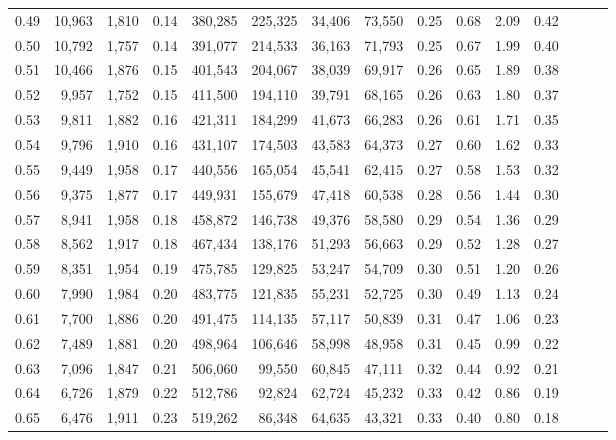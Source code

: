\begin{tabular}{rrrrrrrrrrrrrrr}
0.49 &  10,963 &  1,810 &  0.14 &  380,285 &  225,325 &   34,406 &   73,550 &  0.25 &  0.68 &  2.09 &      0.42 \\
0.50 &  10,792 &  1,757 &  0.14 &  391,077 &  214,533 &   36,163 &   71,793 &  0.25 &  0.67 &  1.99 &      0.40 \\
0.51 &  10,466 &  1,876 &  0.15 &  401,543 &  204,067 &   38,039 &   69,917 &  0.26 &  0.65 &  1.89 &      0.38 \\
0.52 &   9,957 &  1,752 &  0.15 &  411,500 &  194,110 &   39,791 &   68,165 &  0.26 &  0.63 &  1.80 &      0.37 \\
0.53 &   9,811 &  1,882 &  0.16 &  421,311 &  184,299 &   41,673 &   66,283 &  0.26 &  0.61 &  1.71 &      0.35 \\
0.54 &   9,796 &  1,910 &  0.16 &  431,107 &  174,503 &   43,583 &   64,373 &  0.27 &  0.60 &  1.62 &      0.33 \\
0.55 &   9,449 &  1,958 &  0.17 &  440,556 &  165,054 &   45,541 &   62,415 &  0.27 &  0.58 &  1.53 &      0.32 \\
0.56 &   9,375 &  1,877 &  0.17 &  449,931 &  155,679 &   47,418 &   60,538 &  0.28 &  0.56 &  1.44 &      0.30 \\
0.57 &   8,941 &  1,958 &  0.18 &  458,872 &  146,738 &   49,376 &   58,580 &  0.29 &  0.54 &  1.36 &      0.29 \\
0.58 &   8,562 &  1,917 &  0.18 &  467,434 &  138,176 &   51,293 &   56,663 &  0.29 &  0.52 &  1.28 &      0.27 \\
0.59 &   8,351 &  1,954 &  0.19 &  475,785 &  129,825 &   53,247 &   54,709 &  0.30 &  0.51 &  1.20 &      0.26 \\
0.60 &   7,990 &  1,984 &  0.20 &  483,775 &  121,835 &   55,231 &   52,725 &  0.30 &  0.49 &  1.13 &      0.24 \\
0.61 &   7,700 &  1,886 &  0.20 &  491,475 &  114,135 &   57,117 &   50,839 &  0.31 &  0.47 &  1.06 &      0.23 \\
0.62 &   7,489 &  1,881 &  0.20 &  498,964 &  106,646 &   58,998 &   48,958 &  0.31 &  0.45 &  0.99 &      0.22 \\
0.63 &   7,096 &  1,847 &  0.21 &  506,060 &   99,550 &   60,845 &   47,111 &  0.32 &  0.44 &  0.92 &      0.21 \\
0.64 &   6,726 &  1,879 &  0.22 &  512,786 &   92,824 &   62,724 &   45,232 &  0.33 &  0.42 &  0.86 &      0.19 \\
0.65 &   6,476 &  1,911 &  0.23 &  519,262 &   86,348 &   64,635 &   43,321 &  0.33 &  0.40 &  0.80 &      0.18 \\

\end{tabular}
